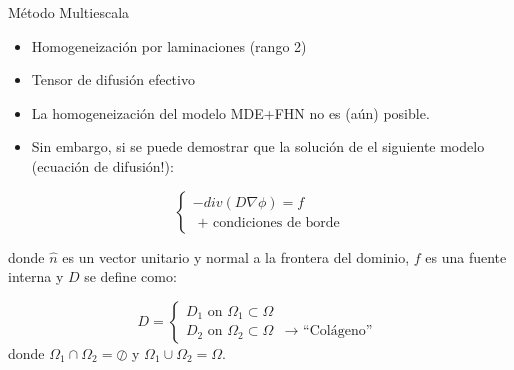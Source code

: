 \documentclass[11pt,spanish]{beamer}
\begin{document}
\begin{frame}{Método Multiescala}

\pause
\begin{itemize}
\item Homogeneización por laminaciones (rango 2)\pause
\item Tensor de difusión efectivo \pause
\item La homogeneización del modelo MDE+FHN no es (aún) posible. \pause
\item Sin embargo, si se puede demostrar que la solución de el siguiente modelo (ecuación de difusión!):
\end{itemize}

\begin{equation}
\left\lbrace
\begin{array}{c} 
-div( D \nabla \phi ) = f \label{difusion} \\
\text{ + condiciones de borde}
\end{array}
\right.
\end{equation}

\noindent donde $\hat{n}$ es un vector unitario y normal a la frontera del dominio, $f$ es una fuente interna y $D$ se define como:

\begin{equation*}
D = \left\lbrace \begin{array}{lr}

D_1 \text{ on } \Omega_1 \subset \Omega \\
D_2 \text{ on } \Omega_2 \subset \Omega & \rightarrow \text{ ``Colágeno'' }

\end{array} \right.
\end{equation*}
\noindent donde $\Omega_1 \cap \Omega_2 = \oslash$ y $\Omega_1 \cup \Omega_2 = \Omega$.
\end{frame}
\end{document}
